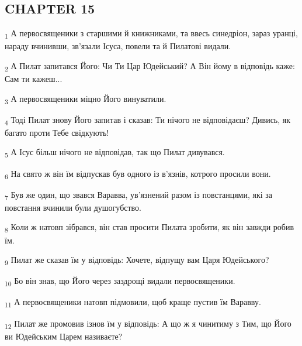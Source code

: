\subsection{CHAPTER 15}
\begin{tcolorbox}
\textsubscript{1} А первосвященики з старшими й книжниками, та ввесь синедріон, зараз уранці, нараду вчинивши, зв'язали Ісуса, повели та й Пилатові видали.
\end{tcolorbox}
\begin{tcolorbox}
\textsubscript{2} А Пилат запитався Його: Чи Ти Цар Юдейський? А Він йому в відповідь каже: Сам ти кажеш...
\end{tcolorbox}
\begin{tcolorbox}
\textsubscript{3} А первосвященики міцно Його винуватили.
\end{tcolorbox}
\begin{tcolorbox}
\textsubscript{4} Тоді Пилат знову Його запитав і сказав: Ти нічого не відповідаєш? Дивись, як багато проти Тебе свідкують!
\end{tcolorbox}
\begin{tcolorbox}
\textsubscript{5} А Ісус більш нічого не відповідав, так що Пилат дивувався.
\end{tcolorbox}
\begin{tcolorbox}
\textsubscript{6} На свято ж він їм відпускав був одного із в'язнів, котрого просили вони.
\end{tcolorbox}
\begin{tcolorbox}
\textsubscript{7} Був же один, що звався Варавва, ув'язнений разом із повстанцями, які за повстання вчинили були душогубство.
\end{tcolorbox}
\begin{tcolorbox}
\textsubscript{8} Коли ж натовп зібрався, він став просити Пилата зробити, як він завжди робив їм.
\end{tcolorbox}
\begin{tcolorbox}
\textsubscript{9} Пилат же сказав їм у відповідь: Хочете, відпущу вам Царя Юдейського?
\end{tcolorbox}
\begin{tcolorbox}
\textsubscript{10} Бо він знав, що Його через заздрощі видали первосвященики.
\end{tcolorbox}
\begin{tcolorbox}
\textsubscript{11} А первосвященики натовп підмовили, щоб краще пустив їм Варавву.
\end{tcolorbox}
\begin{tcolorbox}
\textsubscript{12} Пилат же промовив ізнов їм у відповідь: А що ж я чинитиму з Тим, що Його ви Юдейським Царем називаєте?
\end{tcolorbox}
